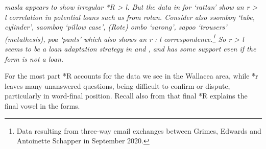  \it{masla} appears to show irregular *R > \it{l}.
But the data in  for ‘rattan’ show an \it{r} > \it{l}
correlation in potential loans such as from  \it{rotan}.
Consider also  \it{səomboŋ} ‘tube,
cylinder’,  \it{saomboŋ} ‘pillow case’,
 (Rote) \it{ombo} ‘sarong’,
 \it{sapoo} ‘trousers’ (metathesis),
 \it{poa} ‘pants’ which also shows an \it{r : l} correspondence.\footnote{
		Data resulting from three-way email exchanges between
		Grimes, Edwards and Antoinette Schapper in September 2020.}
So \it{r > l} seems to be a loan adaptation strategy in 
and , and has some support even if the  form is not
a loan.

For the most part *R accounts for the data we see in the Wallacea
area, while *r leaves many unanswered questions,
being difficult to confirm or dispute,
particularly in word-final position.
Recall also from  that final *R explains the
final vowel in the  forms.